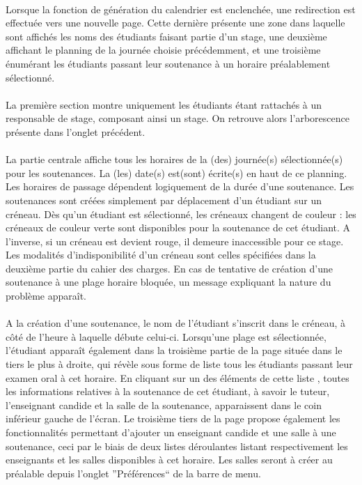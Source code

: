 \documentclass[a4paper,10pt]{report}
\begin{document}
	      \paragraph{}
		Lorsque la fonction de génération du calendrier est enclenchée, une redirection est effectuée vers une nouvelle page.
		Cette dernière présente une zone dans laquelle sont affichés les noms des étudiants faisant partie d'un stage, une deuxième affichant le planning de la journée choisie précédemment, et une troisième énumérant les étudiants passant leur soutenance à un horaire préalablement sélectionné.
		
	      \paragraph{}
		La première section montre uniquement les étudiants étant rattachés à un responsable de stage, composant ainsi un stage.
		On retrouve alors l'arborescence présente dans l'onglet précédent.
		
	      \paragraph{}
		La partie centrale affiche tous les horaires de la (des) journée(s) sélectionnée(s) pour les soutenances.
		La (les) date(s) est(sont) écrite(s) en haut de ce planning.
		Les horaires de passage dépendent logiquement de la durée d'une soutenance.
		Les soutenances sont créées simplement par déplacement d'un étudiant sur un créneau.
		Dès qu'un étudiant est sélectionné, les créneaux changent de couleur : les créneaux de couleur verte sont disponibles pour la soutenance de cet étudiant.
		A l'inverse, si un créneau est devient rouge, il demeure inaccessible pour ce stage.
		Les modalités d'indisponibilité d'un créneau sont celles spécifiées dans la deuxième partie du cahier des charges.
		En cas de tentative de création d'une soutenance à une plage horaire bloquée, un message expliquant la nature du problème apparaît.
		
	      \paragraph{}
		A la création d'une soutenance, le nom de l'étudiant s'inscrit dans le créneau, à côté de l'heure à laquelle débute celui-ci.
		Lorsqu'une plage est sélectionnée, l'étudiant apparaît également dans la troisième partie de la page située dans le tiers le plus à droite, qui révèle sous forme de liste tous les étudiants passant leur examen oral à cet horaire.
		En cliquant sur un des éléments de cette liste , toutes les informations relatives à la soutenance de cet étudiant, à savoir le tuteur, l'enseignant candide et la salle de la soutenance, apparaissent dans le coin inférieur gauche de l'écran.
		Le troisième tiers de la page propose également les fonctionnalités permettant d'ajouter un enseignant candide et une salle à une soutenance, ceci par le biais de deux listes déroulantes listant respectivement les enseignants et les salles disponibles à cet horaire.
		Les salles seront à créer au préalable depuis l'onglet ''Préférences`` de la barre de menu.
		
\end{document}
